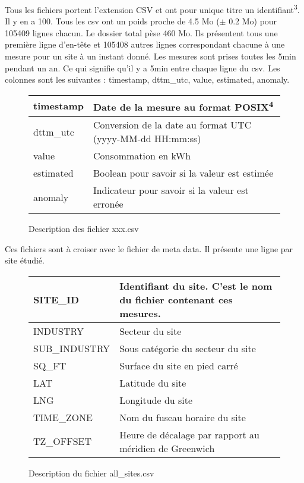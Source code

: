 \par Tous les fichiers portent l'extension CSV et ont pour unique titre un identifiant\textsuperscript{3}. Il y en a 100. Tous les csv ont un poids proche de 4.5 Mo ($\pm$ 0.2 Mo) pour 105409 lignes chacun. Le dossier total pèse 460 Mo. Ils présentent tous une première ligne d'en-tête et 105408 autres lignes correspondant chacune à une mesure pour un site à un instant donné. Les mesures sont prises toutes les 5min pendant un an. Ce qui signifie qu'il y a 5min entre chaque ligne du csv. Les colonnes sont les suivantes : timestamp, dttm\_utc, value, estimated, anomaly.

\begin{figure}[h!]
\centering

\begin{tabular}{|l|l|}
\hline
timestamp&Date de la mesure au format POSIX\textsuperscript{4} \\ \hline
dttm\_utc&Conversion de la date au format UTC (yyyy-MM-dd HH:mm:ss)\\ \hline
value&Consommation en kWh\\ \hline
estimated&Boolean pour savoir si la valeur est estimée\\ \hline
anomaly&Indicateur pour savoir si la valeur est erronée\\ \hline
\end{tabular}

\caption{Description des fichier xxx.csv}
\end{figure}

Ces fichiers sont à croiser avec le fichier de meta data. Il présente une ligne par site étudié. \newpage

\begin{figure}[h!]
\centering

\begin{tabular}{|l|l|}
\hline
SITE\_ID&Identifiant du site. C’est le nom du fichier contenant ces mesures.\\ \hline
INDUSTRY&Secteur du site\\ \hline
SUB\_INDUSTRY&Sous catégorie du secteur du site\\ \hline
SQ\_FT&Surface du site en pied carré\\ \hline
LAT&Latitude du site\\ \hline
LNG&Longitude du site\\ \hline
TIME\_ZONE&Nom du fuseau horaire du site\\ \hline
TZ\_OFFSET&Heure de décalage par rapport au méridien de Greenwich\\ \hline

\end{tabular}

\caption{Description du fichier all\_sites.csv}
\end{figure}

